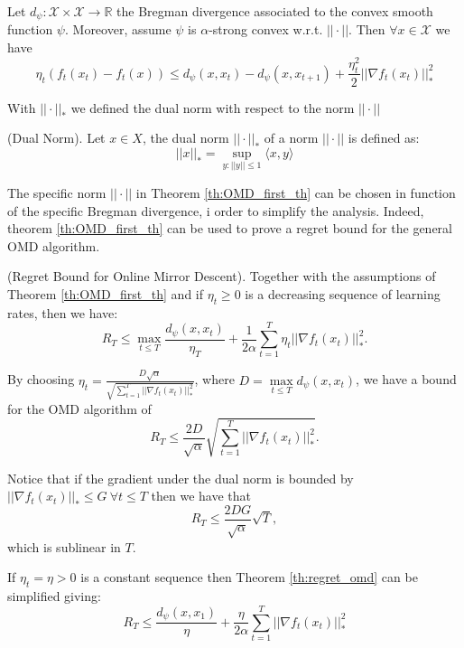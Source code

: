 \begin{theorem}\label{th:OMD_first_th}
Let $d_\psi:\mathcal X\times\mathcal X\to \mathbb R$ the Bregman divergence associated to the convex smooth function $\psi$. Moreover, assume $\psi$ is $\alpha$-strong convex w.r.t. $||\cdot||$.
Then $\forall x\in\mathcal X$ we have 
$$\eta_t (f_t(x_t)-f_t(x))\le d_\psi(x,x_t)-d_\psi(x,x_{t+1})+\frac{\eta_t^2}{2}||\nabla f_t(x_t)||_*^2$$ 
\end{theorem}

With $||\cdot||_*$ we defined the dual norm with respect to the norm $||\cdot||$ 

\begin{definition}(Dual Norm).
Let $x\in X$, the dual norm $||\cdot||_*$ of a norm $||\cdot||$ is defined as:
$$||x||_*=\sup\limits_{y:||y||\le1}\langle x,y\rangle$$
\end{definition}

The specific norm $||\cdot||$ in  Theorem \ref{th:OMD_first_th} can be chosen in function of the specific Bregman divergence, i order to simplify the analysis. Indeed, theorem \ref{th:OMD_first_th} can be used to prove a regret bound for the general OMD algorithm. 

\begin{theorem}(Regret Bound for Online Mirror Descent).\label{th:regret_omd} Together with the assumptions of Theorem \ref{th:OMD_first_th} and if $\eta_t\ge0$ is a decreasing sequence of learning rates, then we have: 
$$R_T\le\max\limits_{t\le T}\frac{d_\psi(x,x_t)}{\eta_T}+\frac{1}{2\alpha}\sum\limits_{t=1}^T\eta_t||\nabla f_t(x_t)||_*^2.$$
\end{theorem}


By choosing $\eta_t=\frac{D\sqrt{\alpha}}{\sqrt{\sum\limits_{t=1}^T||\nabla f_t(x_t)||_*^2}}$, where $D=\max\limits_{t\le T}d_\psi(x,x_t)$, we have a bound for the OMD algorithm of 
\begin{equation}
R_T\le\frac{2D}{\sqrt\alpha}\sqrt{\sum\limits_{t=1}^T||\nabla f_t(x_t)||_*^2}.
\end{equation}

Notice that if the gradient under the dual norm is bounded by $||\nabla f_t(x_t)||_*\le G\ \forall t\le T$ then we have that 
\begin{equation}
R_T\le\frac{2DG}{\sqrt\alpha}\sqrt T,
\end{equation}
which is sublinear in $T$.

If $\eta_t=\eta>0$ is a constant sequence then Theorem \ref{th:regret_omd} can be simplified giving: 
\begin{equation}
R_T\le \frac{d_\psi(x,x_1)}{\eta}+\frac{\eta}{2\alpha}\sum\limits_{t=1}^T||\nabla f_t(x_t)||^2_*
\end{equation}

